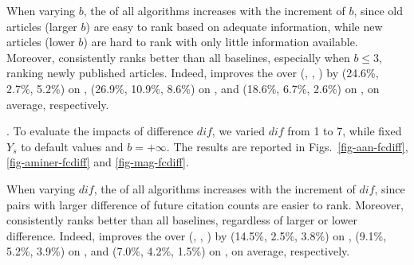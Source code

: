 When varying $b$, the \PairAcc of all algorithms increases with the increment of $b$, since old articles (larger $b$) are easy to rank based on adequate information, while new articles (lower $b$) are hard to rank with only little information available. Moreover, \ensemblerank consistently ranks better than all baselines, especially when $b\le3$, \ie ranking newly published articles. Indeed, \ensemblerank improves the \PairAcc over (\pagerank, \futurerank, \hhgrank) by (24.6\%, 2.7\%, 5.2\%) on \aan, (26.9\%, 10.9\%, 8.6\%) on \aminer, and (18.6\%, 6.7\%, 2.6\%) on \magdata, on average, respectively.



. %
To evaluate the impacts of %
difference $dif$, we varied $dif$ from 1 to 7, while fixed $Y_s$ to default values and $b=+\infty$. The results are reported in Figs.~\ref{fig-aan-fcdiff}, \ref{fig-aminer-fcdiff} and \ref{fig-mag-fcdiff}.


When varying $dif$, the \PairAcc of all algorithms increases with the increment of $dif$, since pairs with larger difference of future citation counts are easier to rank. Moreover, \ensemblerank consistently ranks better than all baselines, regardless of larger or lower difference. Indeed, \ensemblerank improves the \PairAcc over (\pagerank, \futurerank, \hhgrank) by (14.5\%, 2.5\%, 3.8\%) on \aan, (9.1\%, 5.2\%, 3.9\%) on \aminer, and (7.0\%, 4.2\%, 1.5\%) on \magdata, on average, respectively.

